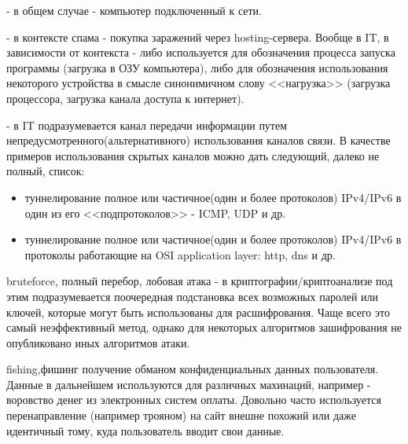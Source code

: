 \begin{description}
\item [ хост, host ]
 - в общем случае - компьютер подключенный к сети.

\item [ загрузка ]
 - в контексте спама - покупка заражений через hosting-сервера. Вообще в IT, в
зависимости от контекста - либо используется для обозначения процесса запуска программы (загрузка в ОЗУ компьютера), либо для обозначения использования некоторого устройства в смысле синонимичном слову <<нагрузка>> (загрузка процессора, загрузка канала доступа к интернет).

\item [ covert channel, covered channel,hidden channel, скрытый канал ]
 - в IT подразумевается канал передачи информации путем
непредусмотренного(альтернативного) использования каналов связи. В качестве примеров использования
скрытых каналов можно дать следующий, далеко не полный, список:
\begin{itemize}
\item{туннелирование полное или частичное(один и более протоколов) IPv4/IPv6 в один из его <<подпротоколов>> - ICMP, UDP и др.}
\item{туннелирование полное или частичное(один и более протоколов) IPv4/IPv6 в протоколы работающие на OSI application layer: http, dns и др.}
\end{itemize}

\item{bruteforce, полный перебор, лобовая атака}
- в криптографии/криптоанализе под этим подразумевается поочередная подстановка всех возможных паролей или ключей, которые могут быть использованы для расшифрования. Чаще всего это самый неэффективный метод, однако для некоторых алгоритмов зашифрования не опубликовано иных алгоритмов атаки.

\item{fishing,фишинг} получение обманом конфиденциальных данных пользователя. Данные в дальнейшем используются для различных махинаций, например - воровство денег из электронных систем оплаты. Довольно часто используется перенаправление (например трояном) на сайт внешне похожий или даже идентичный тому, куда пользователь вводит свои данные.

\label{glossary_end}
\end{description}
